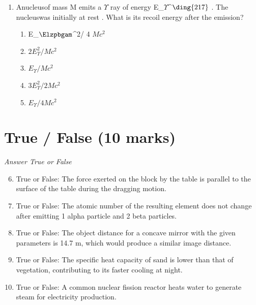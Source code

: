 \documentclass[12pt]{article}
\begin{document}
\begin{enumerate}[label=\arabic*.]
\begin{enumerate}[label=(\alph*)]
    \item 15.5 s
    \item 9.0 s
    \item 8.0 s
    \item 10.5 s
\end{enumerate}
\item Anucleusof mass M emits a \ensuremath{\Upsilon} ray of energy E\_\ensuremath{\Upsilon}^\ensuremath{\ding{217}} . The nucleuswas initially at rest . What is its recoil energy after the emission?
\begin{enumerate}[label=(\alph*)]
    \item E\_\ensuremath{\Elzpbgam}^2/ 4 $Mc^2$
    \item \( 2 E_{\Upsilon}^2 / Mc^2 \)
    \item \( E_{\Upsilon} / Mc^2 \)
    \item \( 3 E_{\Upsilon}^2 / 2 Mc^2 \)
    \item \( E_{\Upsilon} / 4 Mc^2 \)
\end{enumerate}
\end{enumerate}

\section*{True / False (10 marks)}
\textit{Answer True or False}
\begin{enumerate}[label=\arabic*.]
\setcounter{enumi}{5}
\item True or False: The force exerted on the block by the table is parallel to the surface of the table during the dragging motion.
\item True or False: The atomic number of the resulting element does not change after emitting 1 alpha particle and 2 beta particles.
\item True or False: The object distance for a concave mirror with the given parameters is 14.7 m, which would produce a similar image distance.
\item True or False: The specific heat capacity of sand is lower than that of vegetation, contributing to its faster cooling at night.
\item True or False: A common nuclear fission reactor heats water to generate steam for electricity production.
\end{enumerate}
\end{document}
